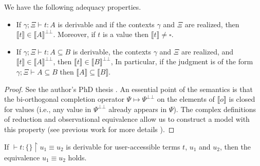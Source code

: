\begin{theorem}[adequacy]
  We have the following adequacy properties.
  \begin{itemize}
    \item If $\gamma; \Xi \vdash t : A$ is derivable and if the contexts
          $\gamma$ and $\Xi$ are realized, then $\llbracket t \rrbracket
          \in \llbracket A \rrbracket^{\bot\bot}$. Moreover, if $t$ is a
          value then $\llbracket t \rrbracket \not= \square$.
    \item If $\gamma; \Xi \vdash t : A \subseteq B$ is derivable, the contexts
          $\gamma$ and $\Xi$ are realized, and $\llbracket t \rrbracket
          \in \llbracket A \rrbracket^{\bot\bot}$, then $\llbracket t
          \rrbracket \in \llbracket B \rrbracket^{\bot\bot}$, In particular,
          if the judgment is of the form $\gamma; \Xi \vdash A \subseteq B$
          then $\llbracket A \rrbracket \subseteq \llbracket B \rrbracket$.
  \end{itemize}
\end{theorem}
\begin{proof}
  See the author's PhD thesis \cite[Chapter~4]{Lepigre2017PhD}. An essential
  point of the semantics is that the bi-orthogonal completion operator
  $\Psi \mapsto \Psi^{\bot\bot}$ on the elements of $\llbracket o \rrbracket$
  is closed for values (i.e., any value in $\Psi^{\bot\bot}$ already appears
  in $\Psi$). The complex definitions of reduction and observational
  equivalence allow us to construct a model with this property (see previous
  work for more details \cite{Lepigre2016,Lepigre2017PhD}).
\end{proof}
\begin{corollary}
  If $\vdash t : \{\} \restriction u_1 \equiv u_2$ is derivable for
  user-accessible terms $t$, $u_1$ and $u_2$, then the equivalence
  $u_1 \equiv u_2$ holds.
\end{corollary}
